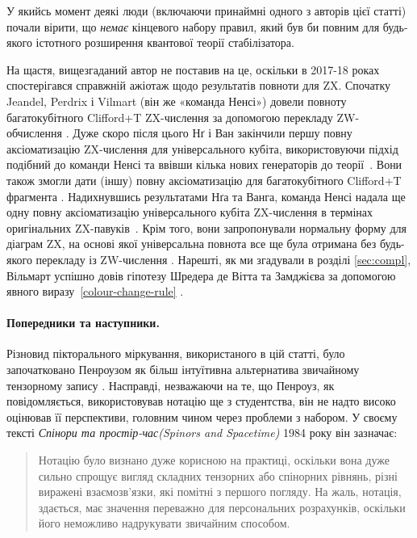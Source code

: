 \documentclass[11pt]{article}
\theoremstyle{definition}
\begin{document}
{У якийсь момент деякі люди (включаючи принаймні одного з авторів цієї статті) почали вірити, що \textit{немає} кінцевого набору правил, який був би повним для будь-якого істотного розширення квантової теорії стабілізатора.

На щастя, вищезгаданий автор не поставив на це, оскільки в 2017-18 роках спостерігався справжній ажіотаж щодо результатів повноти для ZX. Спочатку Jeandel, Perdrix і Vilmart (він же «команда Ненсі») довели повноту багатокубітного Clifford+T ZX-числення за допомогою перекладу ZW-обчислення \cite{jeandel2018complete}. Дуже скоро після цього Нґ і Ван закінчили першу повну аксіоматизацію ZX-числення для універсального кубіта, використовуючи підхід подібний до команди Ненсі та ввівши кілька нових генераторів до теорії~\cite{ng2017universal}. Вони також змогли дати (іншу) повну аксіоматизацію для багатокубітного Clifford+T фрагмента \cite{ngwang2, hadzihasanovic2018two}. Надихнувшись результатами Нґа та Ванга, команда Ненсі надала ще одну повну аксіоматизацію універсального кубіта ZX-числення в термінах оригінальних ZX-павуків~\cite{jeandel2018diagrammatic}. Крім того, вони запропонували нормальну форму для діаграм ZX, на основі якої універсальна повнота все ще була отримана без будь-якого перекладу із ZW-числення \cite{jpvnormalform}. Нарешті, як ми згадували в розділі \ref{sec:compl}, Вільмарт успішно довів гіпотезу Шредера де Вітта та Замджієва за допомогою явного виразу~\eqref{colour-change-rule} \cite{vilmart2019near}.


\paragraph{Попередники та наступники.} Різновид пікторального міркування, використаного в цій статті, було започатковано Пенроузом як більш інтуїтивна альтернатива звичайному тензорному запису \cite{Penrose}. Насправді, незважаючи на те, що Пенроуз, як повідомляється, використовував нотацію ще з студентства, він не надто високо оцінював її перспективи, головним чином через проблеми з набором. У своєму тексті \textit{Спінори та простір-час(Spinors and Spacetime)} 1984 року він зазначає:
\begin{quote}
Нотацію було визнано дуже корисною на практиці, оскільки вона дуже сильно
спрощує вигляд складних тензорних або спінорних рівнянь,
різні виражені взаємозв'язки, які помітні з першого погляду.
На жаль, нотація, здається, має значення переважно для персональних
розрахунків, оскільки його неможливо надрукувати звичайним способом.
\end{quote}

}
\end{document}
